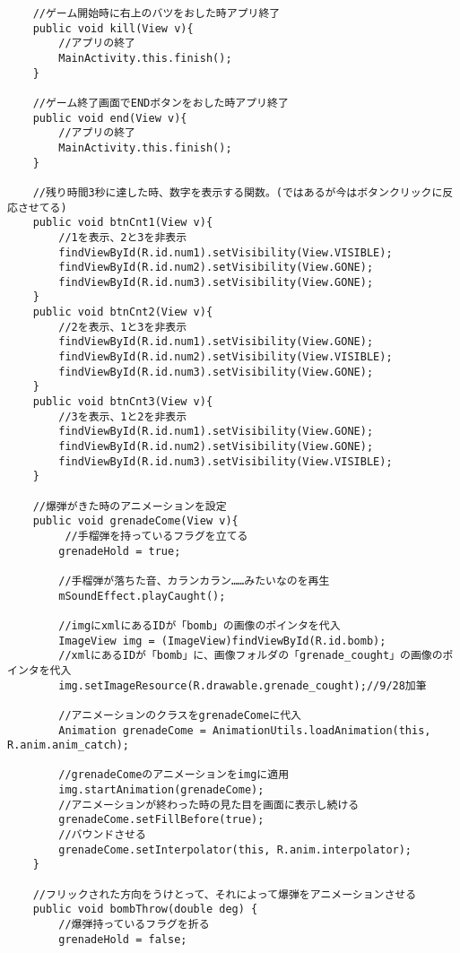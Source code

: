 \documentclass[11pt,a4j]{jarticle}
\begin{document}
\begin{verbatim}
    //ゲーム開始時に右上のバツをおした時アプリ終了
    public void kill(View v){
        //アプリの終了
        MainActivity.this.finish();
    }

    //ゲーム終了画面でENDボタンをおした時アプリ終了
    public void end(View v){
        //アプリの終了
        MainActivity.this.finish();
    }

    //残り時間3秒に達した時、数字を表示する関数。(ではあるが今はボタンクリックに反応させてる)
    public void btnCnt1(View v){
        //1を表示、2と3を非表示
        findViewById(R.id.num1).setVisibility(View.VISIBLE);
        findViewById(R.id.num2).setVisibility(View.GONE);
        findViewById(R.id.num3).setVisibility(View.GONE);
    }
    public void btnCnt2(View v){
        //2を表示、1と3を非表示
        findViewById(R.id.num1).setVisibility(View.GONE);
        findViewById(R.id.num2).setVisibility(View.VISIBLE);
        findViewById(R.id.num3).setVisibility(View.GONE);
    }
    public void btnCnt3(View v){
        //3を表示、1と2を非表示
        findViewById(R.id.num1).setVisibility(View.GONE);
        findViewById(R.id.num2).setVisibility(View.GONE);
        findViewById(R.id.num3).setVisibility(View.VISIBLE);
    }

    //爆弾がきた時のアニメーションを設定
    public void grenadeCome(View v){
         //手榴弾を持っているフラグを立てる
        grenadeHold = true;
        
        //手榴弾が落ちた音、カランカラン……みたいなのを再生
        mSoundEffect.playCaught();

        //imgにxmlにあるIDが「bomb」の画像のポインタを代入
        ImageView img = (ImageView)findViewById(R.id.bomb);
        //xmlにあるIDが「bomb」に、画像フォルダの「grenade_cought」の画像のポインタを代入
        img.setImageResource(R.drawable.grenade_cought);//9/28加筆

        //アニメーションのクラスをgrenadeComeに代入
        Animation grenadeCome = AnimationUtils.loadAnimation(this, R.anim.anim_catch);
        
        //grenadeComeのアニメーションをimgに適用
        img.startAnimation(grenadeCome);
        //アニメーションが終わった時の見た目を画面に表示し続ける
        grenadeCome.setFillBefore(true);
        //バウンドさせる
        grenadeCome.setInterpolator(this, R.anim.interpolator);
    }

    //フリックされた方向をうけとって、それによって爆弾をアニメーションさせる
    public void bombThrow(double deg) {
        //爆弾持っているフラグを折る
        grenadeHold = false;


\end{verbatim}
\end{document}
